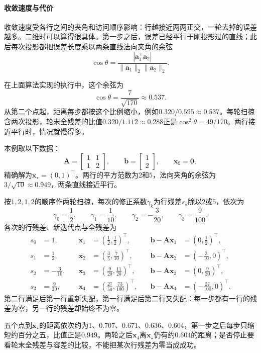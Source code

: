 \paragraph{收敛速度与代价}
收敛速度受各行之间的夹角和访问顺序影响：行越接近两两正交，一轮去掉的误差越多。二维时可以算得很具体。第一步之后，误差已经平行于刚投影过的直线；此后每次投影都把误差长度乘以两条直线法向夹角的余弦
\begin{equation}
 \cos\theta=\frac{|\bm a_1^\top\bm a_2|}{\lVert\bm a_1\rVert_2\lVert\bm a_2\rVert_2}.
 \label{eq:ls-kaczmarz-angle-cosine}
\end{equation}

在上面算法实现的执行中，这个余弦为
\[
 \cos\theta=\frac{7}{\sqrt{170}}\approx0.537 .
\]
从第二个点起，距离每步都按这个比例缩小，例如$0.320/0.595\approx0.537$。每轮扫掠含两次投影，轮末全残差的比值$0.320/1.112\approx0.288$正是$\cos^2\theta=49/170$。两行接近平行时，情况就慢得多。

\begin{example}[循环Kaczmarz的两轮扫掠]
\label{ex:ls-kaczmarz-two-sweeps}
本例取以下数据：
\[
 \bm A=\begin{bmatrix}1&1\\1&2\end{bmatrix},\qquad \bm b=\begin{bmatrix}1\\2\end{bmatrix},\qquad \bm x_0=\bm0,
\]
精确解为$\bm x_\star=(0,1)^\top$。两行的平方范数为$2$和$5$，法向夹角的余弦为$3/\sqrt{10}\approx0.949$，两条直线接近平行。

按$1,2,1,2$的顺序作两轮扫掠，每次的修正系数$\gamma_k$为行残差$s_k$除以$2$或$5$，依次为
\[
 \gamma_0=\frac12,\qquad \gamma_1=\frac1{10},\qquad \gamma_2=-\frac3{20},\qquad \gamma_3=\frac9{100}.
\]
各次的行残差、新迭代点与全残差为
\[
 \begin{aligned}
 s_0&=1,&\quad \bm x_1&=(\tfrac12,\tfrac12)^\top,&\quad \bm b-\bm A\bm x_1&=(0,\tfrac12)^\top,\\
 s_1&=\tfrac12,&\quad \bm x_2&=(\tfrac35,\tfrac7{10})^\top,&\quad \bm b-\bm A\bm x_2&=(-\tfrac3{10},0)^\top,\\
 s_2&=-\tfrac3{10},&\quad \bm x_3&=(\tfrac9{20},\tfrac{11}{20})^\top,&\quad \bm b-\bm A\bm x_3&=(0,\tfrac9{20})^\top,\\
 s_3&=\tfrac9{20},&\quad \bm x_4&=(\tfrac{27}{50},\tfrac{73}{100})^\top,&\quad \bm b-\bm A\bm x_4&=(-\tfrac{27}{100},0)^\top.
 \end{aligned}
\]
第二行满足后第一行重新失配，第一行满足后第二行又失配：每一步都有一行的残差为零，另一行的残差却始终不为零。

五个点到$\bm x_\star$的距离依次约为$1$、$0.707$、$0.671$、$0.636$、$0.604$，第一步之后每步只缩短约百分之五，比值正是$0.949$。两轮之后$\bm x_4$离$\bm x_\star$仍有约$0.604$的距离；是否停止要看轮末全残差与容差的比较，不能把某次行残差为零当成成功。
\end{example}

